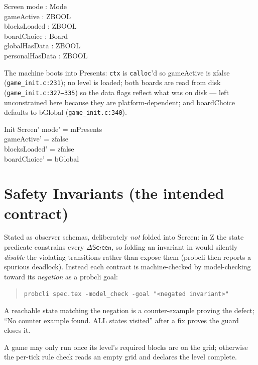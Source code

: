 \documentclass[a4paper,10pt,fleqn]{article}
\begin{document}
\begin{schema}{Screen}
  mode : Mode \\
  gameActive : ZBOOL \\
  blocksLoaded : ZBOOL \\
  boardChoice : Board \\
  globalHasData : ZBOOL \\
  personalHasData : ZBOOL
\end{schema}

The machine boots into \textsf{Presents}: \texttt{ctx} is
\texttt{calloc}'d so \textsf{gameActive} is \textsf{zfalse}
(\texttt{game\_init.c:231}); no level is loaded; both boards are read
from disk (\texttt{game\_init.c:327--335}) so the data flags reflect
what was on disk --- left unconstrained here because they are
platform-dependent; and \textsf{boardChoice} defaults to
\textsf{bGlobal} (\texttt{game\_init.c:340}).

\begin{schema}{Init}
  Screen'
  \where
  mode' = mPresents \\
  gameActive' = zfalse \\
  blocksLoaded' = zfalse \\
  boardChoice' = bGlobal
\end{schema}

\section{Safety Invariants (the intended contract)}

Stated as observer schemas, deliberately \emph{not} folded into
\textsf{Screen}: in Z the state predicate constrains every
$\Delta\textsf{Screen}$, so folding an invariant in would silently
\emph{disable} the violating transitions rather than expose them (probcli
then reports a spurious deadlock).  Instead each contract is machine-checked
by model-checking toward its \emph{negation} as a probcli goal:
\begin{quote}
\texttt{probcli spec.tex -model\_check -goal "<negated invariant>"}
\end{quote}
A reachable state matching the negation is a counter-example proving the
defect; ``\textsf{No counter example found. ALL states visited}'' after a
fix proves the guard closes it.

A game may only run once its level's required blocks are on the grid;
otherwise the per-tick rule check reads an empty grid and declares the
level complete.
\end{document}
